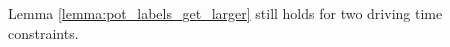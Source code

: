 
\begin{lemma}
	Lemma \ref{lemma:pot_labels_get_larger} still holds for two driving time constraints.
\end{lemma}

